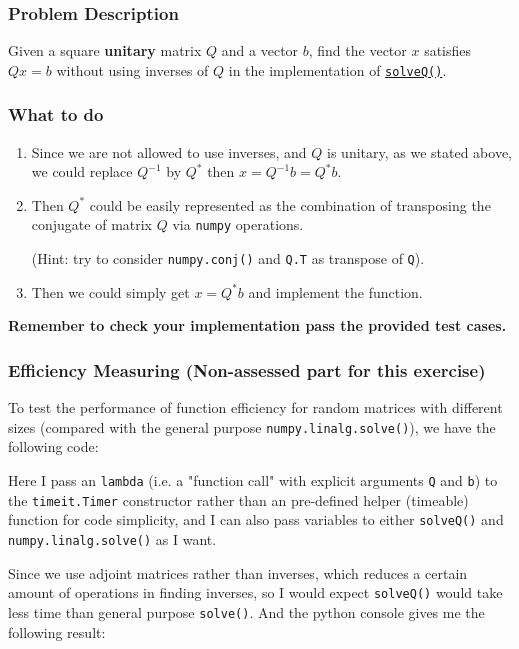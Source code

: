 \subsubsection*{Problem Description}%
Given a square \textbf{unitary} matrix $Q$ and a vector $b$, find the vector $x$ satisfies $Qx = b$ without using inverses of $Q$ in the implementation of \href{https://comp-lin-alg.github.io/cla_utils.html#cla_utils.exercises2.solveQ}{\texttt{solveQ()}}.

\subsubsection*{What to do}%
\begin{enumerate}
\item Since we are not allowed to use inverses, and $Q$ is unitary, as we stated above, we could replace $Q^{-1}$ by $Q^{*}$ then $x = Q^{-1}b = Q^{*}b$.
\item Then $Q^{*}$ could be easily represented as the combination of transposing the conjugate of matrix $Q$ via \texttt{numpy} operations.

(Hint: try to consider \texttt{numpy.conj()} and \texttt{Q.T} as transpose of \texttt{Q}).
\item Then we could simply get $x = Q^{*}b$ and implement the function.
\end{enumerate}
\textbf{Remember to check your implementation pass the provided test cases.}

\subsubsection*{Efficiency Measuring (Non-assessed part for this exercise)}%
To test the performance of function efficiency for random matrices with different sizes (compared with the general purpose \texttt{numpy.linalg.solve()}), we have the following code:

Here I pass an \texttt{lambda} (i.e. a "function call" with explicit arguments \texttt{Q} and \texttt{b}) to the \texttt{timeit.Timer} constructor rather than an pre-defined helper (timeable) function for code simplicity, and I can also pass variables to either \texttt{solveQ()} and \texttt{numpy.linalg.solve()} as I want.

\medskip
\noindent Since we use adjoint matrices rather than inverses, which reduces a certain amount of operations in finding inverses, so I would expect \texttt{solveQ()} would take less time than general purpose \texttt{solve()}. And the python console gives me the following result:

